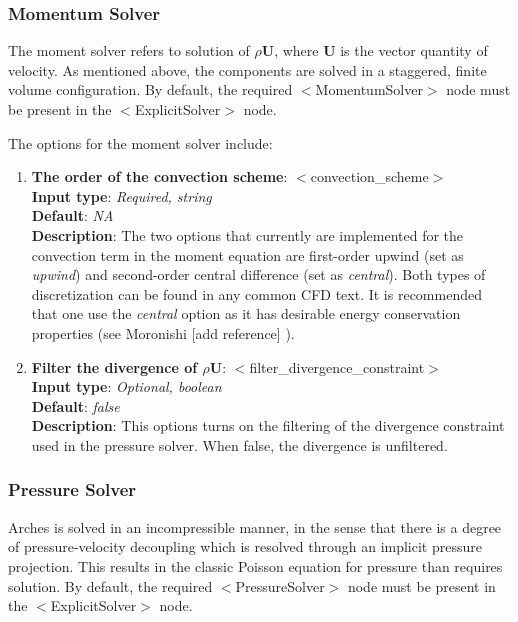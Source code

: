 \subsubsection{Momentum Solver}
The moment solver refers to solution of $\rho \mathbf{U}$, where $\mathbf{U}$ is the vector quantity of velocity.  As mentioned above, the components are solved in a staggered, finite volume configuration. By default, the required $<$MomentumSolver$>$ node must be present in the $<$ExplicitSolver$>$ node.   

The options for the moment solver include:
\begin{enumerate}
%
\item {\bf The order of the convection scheme}: $<$convection\_scheme$>$ \\
{\bf Input type}: {\it Required, string} \\
{\bf Default}: {\it NA } \\ 
{\bf Description}: The two options that currently are implemented for the convection term in the moment equation are first-order upwind (set as {\it upwind}) and second-order central difference (set as {\it central}).  Both types of discretization can be found in any common CFD text.  It is recommended that one use the {\it central} option as it has desirable energy conservation properties (see Moronishi [add reference] ).  
%
\item {\bf Filter the divergence of $\rho \mathbf{U}$}: $<$filter\_divergence\_constraint$>$ \\
{\bf Input type}: {\it Optional, boolean} \\
{\bf Default}: {\it false } \\ 
{\bf Description}: This options turns on the filtering of the divergence constraint used in the pressure solver. When false, the divergence is unfiltered.  
%
\end{enumerate}

\subsubsection{Pressure Solver}
Arches is solved in an incompressible manner, in the sense that there is a degree of pressure-velocity decoupling which is resolved through an implicit pressure projection.  This results in the classic Poisson equation for pressure than requires solution.  By default, the required $<$PressureSolver$>$ node must be present in the $<$ExplicitSolver$>$ node.

